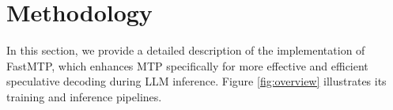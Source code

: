 \documentclass{article} %
\begin{document}




\section{Methodology}

In this section, we provide a detailed description of the implementation of FastMTP, which enhances MTP specifically for more effective and efficient speculative decoding during LLM inference. Figure \ref{fig:overview} illustrates its training and inference pipelines.
\end{document}
